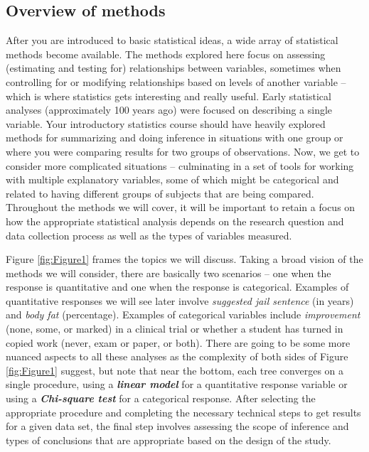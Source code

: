 \documentclass[]{article}
\begin{document}
\subsection{Overview of methods}\label{overview-of-methods}

After you are introduced to basic statistical ideas, a wide array of
statistical methods become available. The methods explored here focus on
assessing (estimating and testing for) relationships between variables,
sometimes when controlling for or modifying relationships based on
levels of another variable -- which is where statistics gets interesting
and really useful. Early statistical analyses (approximately 100 years
ago) were focused on describing a single variable. Your introductory
statistics course should have heavily explored methods for summarizing
and doing inference in situations with one group or where you were
comparing results for two groups of observations. Now, we get to
consider more complicated situations -- culminating in a set of tools
for working with multiple explanatory variables, some of which might be
categorical and related to having different groups of subjects that are
being compared. Throughout the methods we will cover, it will be
important to retain a focus on how the appropriate statistical analysis
depends on the research question and data collection process as well as
the types of variables measured.

Figure \ref{fig:Figure1} frames the topics we will discuss. Taking a
broad vision of the methods we will consider, there are basically two
scenarios -- one when the response is quantitative and one when the
response is categorical. Examples of quantitative responses we will see
later involve \emph{suggested jail sentence} (in years) and \emph{body
fat} (percentage). Examples of categorical variables include
\emph{improvement} (none, some, or marked) in a clinical trial or
whether a student has turned in copied work (never, exam or paper, or
both). There are going to be some more nuanced aspects to all these
analyses as the complexity of both sides of Figure \ref{fig:Figure1}
suggest, but note that near the bottom, each tree converges on a single
procedure, using a \textbf{\emph{linear model}} for a quantitative
response variable or using a \textbf{\emph{Chi-square test}} for a
categorical response. After selecting the appropriate procedure and
completing the necessary technical steps to get results for a given data
set, the final step involves assessing the scope of inference and types
of conclusions that are appropriate based on the design of the study.
\end{document}

